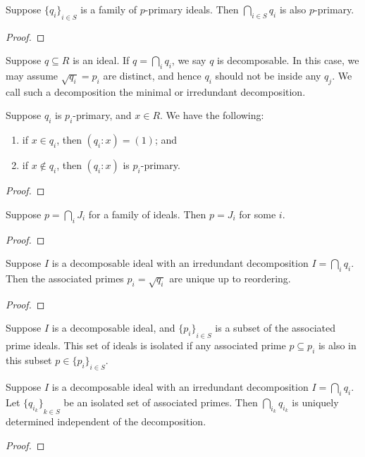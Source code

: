 \begin{lemma}
    Suppose \({\{q_i\}}_{i \in S}\) is a family of \(p\)-primary ideals.
    Then \(\bigcap_{i \in S} q_i\) is also \(p\)-primary.
\end{lemma}
\begin{proof}
    
\end{proof}
\begin{definition}
    Suppose \(q \subseteq R\) is an ideal.
    If \(q = \bigcap_i q_i\), we say \(q\) is decomposable.
    In this case, we may assume \(\sqrt{q_i} = p_i\) are distinct,
    and hence \(q_i\) should not be inside any \(q_j\).
    We call such a decomposition the minimal or irredundant decomposition.
\end{definition}
\begin{lemma}
    Suppose \(q_i\) is \(p_i\)-primary, and \(x \in R\).
    We have the following:
    \begin{enumerate}[label={(\alph*)}, itemsep=0mm]
        \item if \(x \in q_i\), then \((q_i:x) = (1)\); and
        \item if \(x \notin q_i\), then \((q_i:x)\) is \(p_i\)-primary.
    \end{enumerate}
\end{lemma}
\begin{proof}
    
\end{proof}
\begin{lemma}
    Suppose \(p = \bigcap_i J_i\) for a family of ideals.
    Then \(p = J_i\) for some \(i\).
\end{lemma}
\begin{proof}
    
\end{proof}
\begin{theorem}
    Suppose \(I\) is a decomposable ideal with an irredundant decomposition \(I = \bigcap_i q_i\).
    Then the associated primes \(p_i = \sqrt{q_i}\) are unique up to reordering.
\end{theorem}
\begin{proof}
    
\end{proof}

\begin{definition}
    Suppose \(I\) is a decomposable ideal,
    and \({\{p_i\}}_{i \in S}\) is a subset of the associated prime ideals.
    This set of ideals is isolated if any associated prime \(p \subseteq p_i\)
    is also in this subset \(p \in {\{p_i\}}_{i \in S}\).
\end{definition}
\begin{theorem}
    Suppose \(I\) is a decomposable ideal with an irredundant decomposition \(I = \bigcap_i q_i\).
    Let \({\{q_{i_k}\}}_{k \in S}\) be an isolated set of associated primes.
    Then \(\bigcap_{i_k} q_{i_k}\) is uniquely determined independent of the decomposition.
\end{theorem}
\begin{proof}
    
\end{proof}


